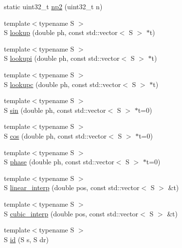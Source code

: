 \begin{DoxyCompactItemize}
static uint32\+\_\+t \hyperlink{namespace_aurora_a49b6f6d92479d80271ced42627154066}{np2} (uint32\+\_\+t n)
\item 
{\footnotesize template$<$typename S $>$ }\\S \hyperlink{namespace_aurora_ae0082f7bc3946a88145d54bacd0c6ff3}{lookup} (double ph, const std\+::vector$<$ S $>$ $\ast$t)
\item 
{\footnotesize template$<$typename S $>$ }\\S \hyperlink{namespace_aurora_a9246ac499667da52a0d1750e5238c4a8}{lookupi} (double ph, const std\+::vector$<$ S $>$ $\ast$t)
\item 
{\footnotesize template$<$typename S $>$ }\\S \hyperlink{namespace_aurora_afab81d7b8873e7850073124fcf37eeea}{lookupc} (double ph, const std\+::vector$<$ S $>$ $\ast$t)
\item 
{\footnotesize template$<$typename S $>$ }\\S \hyperlink{namespace_aurora_a76909b8c5d5801213d35fffa69499885}{sin} (double ph, const std\+::vector$<$ S $>$ $\ast$t=0)
\item 
{\footnotesize template$<$typename S $>$ }\\S \hyperlink{namespace_aurora_a0269c3758ab62d6a910cd8f7ace7fba2}{cos} (double ph, const std\+::vector$<$ S $>$ $\ast$t=0)
\item 
{\footnotesize template$<$typename S $>$ }\\S \hyperlink{namespace_aurora_a6a6af5d9695d0ec8fcb343c456c1faab}{phase} (double ph, const std\+::vector$<$ S $>$ $\ast$t=0)
\item 
{\footnotesize template$<$typename S $>$ }\\S \hyperlink{namespace_aurora_acdc5f35b9cbf54f7fc84a423d76bd488}{linear\+\_\+interp} (double pos, const std\+::vector$<$ S $>$ \&t)
\item 
{\footnotesize template$<$typename S $>$ }\\S \hyperlink{namespace_aurora_a35b9cf383290bddedd82b7c3d0f05e81}{cubic\+\_\+interp} (double pos, const std\+::vector$<$ S $>$ \&t)
\item 
{\footnotesize template$<$typename S $>$ }\\S \hyperlink{namespace_aurora_aca47d4c2fcfc307c85418fe7a0b1e98e}{id} (S s, S dr)
\end{DoxyCompactItemize}
